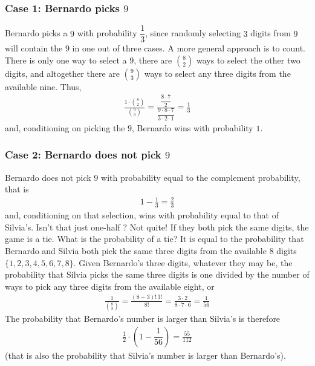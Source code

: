 \documentclass[12pt]{article}
\begin{document}
\nopagebreak


\begin{answer}
\subsubsection*{Case 1: Bernardo picks $\mathrm{9}$}
Bernardo picks a $9$ with probability $\dfrac{1}{3}$, since randomly selecting $3$ digits from $9$ will contain the $9$ in one out of three cases. A more general approach is to count. There is only one way to select a $9$, there are $\displaystyle\binom{8}{2}$ ways to select the other two digits, and altogether there are $\displaystyle\binom{9}{3}$ ways to select any three digits from the available nine. Thus,
\begin{align*}
\frac{1 \cdot \displaystyle\binom{8}{2}}{\displaystyle\binom{9}{3}} 
  = \frac{\dfrac{8\cdot7}{2}}{\dfrac{9\cdot8\cdot7}{3\cdot2\cdot1}}
  = \frac{1}{3}
\end{align*}
and, conditioning on picking the $9$, Bernardo wins with probability $1$. 

\subsubsection*{Case 2: Bernardo does not pick $\mathrm{9}$}
Bernardo does not pick $9$ with probability equal to the complement probability, that is
\begin{align*}
1- \frac{1}{3} 
  = \frac{2}{3}
\end{align*}
and, conditioning on that selection, wins with probability equal to that of Silvia's. Isn't that just one-half ? Not quite! If they both pick the same digits, the game is a tie. What is the probability of a tie? It is equal to the probability that Bernardo and Silvia both pick the same three digits from the available $8$ digits $\{1,2,3,4,5,6,7,8\}$. Given Bernardo's three digits, whatever they may be, the probability that Silvia picks the same three digits is one divided by the number of ways to pick any three digits from the available eight, or
\begin{align*}
\frac{1}{\displaystyle\binom{8}{3}}
  = \frac{(8-3)!\,3!}{8!}
  = \frac{3\cdot2}{8\cdot7\cdot6} 
  = \frac{1}{56}
\end{align*}
The probability that Bernardo's number is larger than Silvia's is therefore
\begin{align*}
\frac{1}{2}\cdot \left(1-\dfrac{1}{56}\right)
  = \frac{55}{112}
\end{align*}
(that is also the probability that Silvia's number is larger than Bernardo's).


\end{answer}
\end{document}
